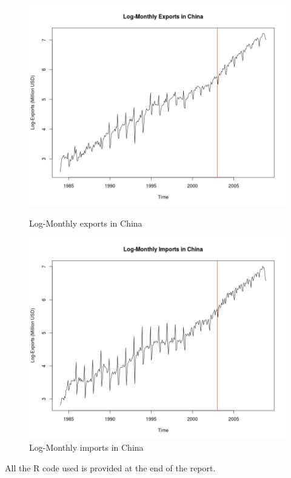 \documentclass[]{article}
\begin{document}
\begin{figure}[!ht]
\centering
\begin{minipage}{.5\textwidth}
\centering
\includegraphics[width=\linewidth]{log_exports}
\caption{Log-Monthly exports in China}
\label{log_exports}
\end{minipage}%
\begin{minipage}{.5\textwidth}
\centering
\includegraphics[width=\linewidth]{log_imports}
\caption{Log-Monthly imports in China}
\label{log_imports}
\end{minipage}
\end{figure}

All the R code used is provided at the end of the report.
\end{document}
